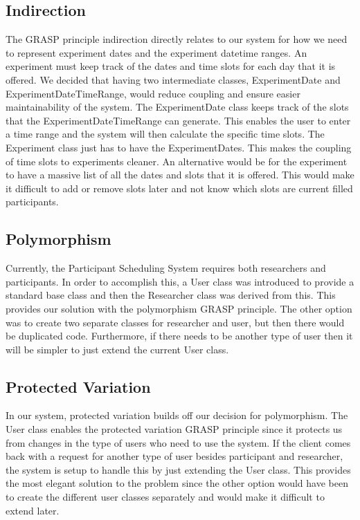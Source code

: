 \subsection{Indirection}
The GRASP principle indirection directly relates to our system for how we need to represent experiment dates and the experiment datetime ranges. An experiment must keep track of the dates and time slots for each day that it is offered. We decided that having two intermediate classes, ExperimentDate and ExperimentDateTimeRange, would reduce coupling and ensure easier maintainability of the system. The ExperimentDate class keeps track of the slots that the ExperimentDateTimeRange can generate. This enables the user to enter a time range and the system will then calculate the specific time slots. The Experiment class just has to have the ExperimentDates. This makes the coupling of time slots to experiments cleaner. An alternative would be for the experiment to have a massive list of all the dates and slots that it is offered. This would make it difficult to add or remove slots later and not know which slots are current filled participants.

\subsection{Polymorphism}
Currently, the Participant Scheduling System requires both researchers and participants. In order to accomplish this, a User class was introduced to provide a standard base class and then the Researcher class was derived from this. This provides our solution with the polymorphism GRASP principle. The other option was to create two separate classes for researcher and user, but then there would be duplicated code. Furthermore, if there needs to be another type of user then it will be simpler to just extend the current User class.

\subsection{Protected Variation}
In our system, protected variation builds off our decision for polymorphism. The User class enables the protected variation GRASP principle since it protects us from changes in the type of users who need to use the system. If the client comes back with a request for another type of user besides participant and researcher, the system is setup to handle this by just extending the User class. This provides the most elegant solution to the problem since the other option would have been to create the different user classes separately and would make it difficult to extend later.